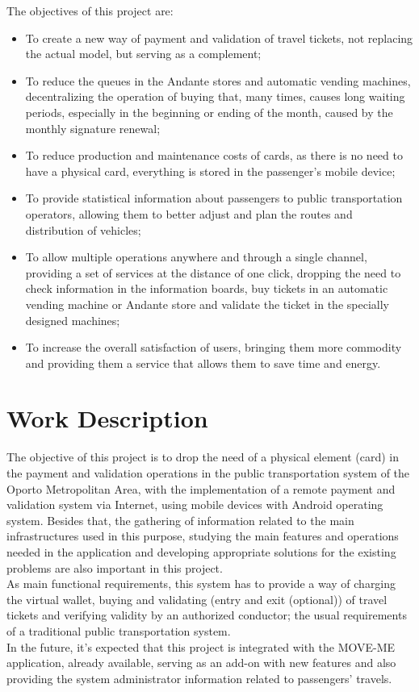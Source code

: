 \documentclass[9pt,a4paper]{extarticle}
\begin{document}
\begin{multicols}{2}
The objectives of this project are:
\begin{itemize}
\item To create a new way of payment and validation of travel tickets, not replacing the actual model, but serving as a complement;
\item To reduce the queues in the Andante stores and automatic vending machines, decentralizing the operation of buying that, many times, causes long waiting periods, especially in the beginning or ending of the month, caused by the monthly signature renewal;
\item To reduce production and maintenance costs of cards, as there is no need to have a physical card, everything is stored in the passenger’s mobile device;
\item To provide statistical information about passengers to public transportation operators, allowing them to better adjust and plan the routes and distribution of vehicles;
\item To allow multiple operations anywhere and through a single channel, providing a set of services at the distance of one click, dropping the need to check information in the information boards, buy tickets in an automatic vending machine or Andante store and validate the ticket in the specially designed machines;
\item To increase the overall satisfaction of users, bringing them more commodity and providing them a service that allows them to save time and energy.
\end{itemize}


\section{Work Description}\label{sec:work}

The objective of this project is to drop the need of a physical element (card) in the payment and validation operations in the public transportation system of the Oporto Metropolitan Area, with the implementation of a remote payment and validation system via Internet, using mobile devices with Android operating system. Besides that, the gathering of information related to the main infrastructures used in this purpose, studying the main features and operations needed in the application and developing appropriate solutions for the existing problems are also important in this project.
\\As main functional requirements, this system has to provide a way of charging the virtual wallet, buying and validating (entry and exit (optional)) of travel tickets and verifying validity by an authorized conductor; the usual requirements of a traditional public transportation system. \cite{Buttyan2009}
\\In the future, it’s expected that this project is integrated with the MOVE-ME application, already available, serving as an add-on with new features and also providing the system administrator information related to passengers’ travels.


\end{multicols}
\end{document}
